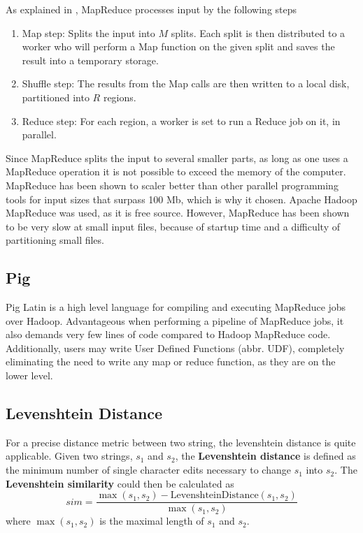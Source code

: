 \documentclass[../../main.tex]{subfiles}
\begin{document}
As explained in \cite{mapreduceExplained}, MapReduce processes input by the following steps
\begin{enumerate}
\item Map step: Splits the input into $M$ splits. Each split is then distributed to a worker who will perform a Map function on the given split and saves the result into a temporary storage.
\item Shuffle step: The results from the Map calls are then written to a local disk, partitioned into $R$ regions.
\item Reduce step: For each region, a worker is set to run a Reduce job on it, in parallel.
\end{enumerate}

Since MapReduce splits the input to several smaller parts, as long as one uses a MapReduce operation it is not possible to exceed the memory of the computer. MapReduce has been shown to scaler better than other parallel programming tools for input sizes that surpass 100 Mb, which is why it chosen.\cite{compForkMapRed} Apache Hadoop MapReduce was used, as it is free source. However, MapReduce has been shown to be very slow at small input files\cite{compForkMapRed}, because of startup time and a difficulty of partitioning small files.

\subsection{Pig}
Pig Latin is a high level language for compiling and executing MapReduce jobs over Hadoop. Advantageous when performing a pipeline of MapReduce jobs\cite{pig}, it also demands very few lines of code compared to Hadoop MapReduce code. Additionally, users may write User Defined Functions (abbr. UDF), completely eliminating the need to write any map or reduce function, as they are on the lower level.

\subsection{Levenshtein Distance}
For a precise distance metric between two string, the levenshtein distance is quite applicable. Given two strings, $s_1$ and $s_2$, the \textbf{Levenshtein distance} is defined as the minimum number of single character edits necessary to change $s_1$ into $s_2$. The \textbf{Levenshtein similarity} could then be calculated as
\begin{equation}\label{levenshteindistance}
sim=\frac{\max(s_1,s_2) - \mathrm{LevenshteinDistance}(s_1,s_2)}{\max(s_1,s_2)}
\end{equation}
where $\max(s_1,s_2)$ is the maximal length of $s_1$ and $s_2$.

 
\end{document}
